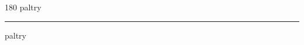 
\begin{frame}
\begin{center}
\begin{turn}{180}
{\fontsize{2.5cm}{1em}\selectfont paltry}
\end{turn}
\vspace{1em}\par  
\hrule
\vspace{1em}\par  
{\fontsize{2.5cm}{1em}\selectfont paltry}
\end{center}
\end{frame}
